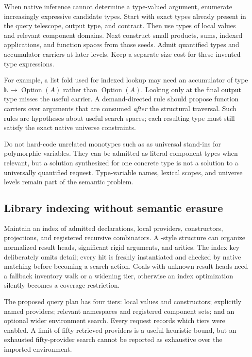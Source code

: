 When native inference cannot determine a type-valued argument, enumerate increasingly expressive candidate types. Start with exact types already present in the query telescope, output type, and contract. Then use types of local values and relevant component domains. Next construct small products, sums, indexed applications, and function spaces from those seeds. Admit quantified types and accumulator carriers at later levels. Keep a separate size cost for these invented type expressions.

For example, a list fold used for indexed lookup may need an accumulator of type $\mathbb N\to\operatorname{Option}(A)$ rather than $\operatorname{Option}(A)$. Looking only at the final output type misses the useful carrier. A demand-directed rule should propose function carriers over arguments that are consumed \emph{after} the structural traversal. Such rules are hypotheses about useful search spaces; each resulting type must still satisfy the exact native universe constraints.

Do not hard-code unrelated monotypes such as  as universal stand-ins for polymorphic variables. They can be admitted as literal component types when relevant, but a solution synthesized for one concrete type is not a solution to a universally quantified request. Type-variable names, lexical scopes, and universe levels remain part of the semantic problem.

\subsection{Library indexing without semantic erasure}

Maintain an index of admitted declarations, local providers, constructors, projections, and registered recursive combinators. A -style structure can organize normalized result heads, significant rigid arguments, and arities. The index key deliberately omits detail; every hit is freshly instantiated and checked by native matching before becoming a search action. Goals with unknown result heads need a fallback inventory walk or a widening tier, otherwise an index optimization silently becomes a coverage restriction.

The proposed query plan has four tiers: local values and constructors; explicitly named providers; relevant namespaces and registered component sets; and an optional wider environment search. Every request records which tiers were enabled. A limit of fifty retrieved providers is a useful heuristic bound, but an exhausted fifty-provider search cannot be reported as exhaustive over the imported environment.

